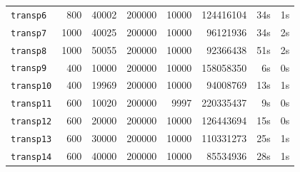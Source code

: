 \documentclass[a4paper,11pt,twoside]{book}
\begin{document}
\begin{multicols}{2}
\begin{center}
\begin{tabular}{|lrrrrrrr|}
\verb/transp6/ &     800 &   40002 &   200000 &    10000 &      124416104 &       34s &    1s \\
\verb/transp7/ &    1000 &   40025 &   200000 &    10000 &       96121936 &       34s &    2s \\
\verb/transp8/ &    1000 &   50055 &   200000 &    10000 &       92366438 &       51s &    2s \\
\verb/transp9/ &     400 &   10000 &   200000 &    10000 &      158058350 &        6s &    0s \\
\verb/transp10/&     400 &   19969 &   200000 &    10000 &       94008769 &       13s &    1s \\
\verb/transp11/&     600 &   10020 &   200000 &     9997 &      220335437 &        9s &    0s \\
\verb/transp12/&     600 &   20000 &   200000 &    10000 &      126443694 &       15s &    0s \\
\verb/transp13/&     600 &   30000 &   200000 &    10000 &      110331273 &       25s &    1s \\
\verb/transp14/&     600 &   40000 &   200000 &    10000 &       85534936 &       28s &    1s \\
\hline
\end{tabular}
\end{center}


\end{multicols}
\end{document}
